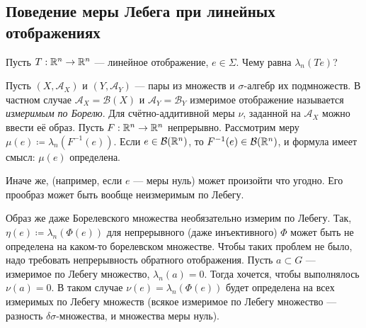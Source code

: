 \documentclass[a4paper]{report}
\begin{document}
    \subsection{Поведение меры Лебега при линейных отображениях}
    Пусть $T: \mathbb{R}^n \rightarrow \mathbb{R}^n$ --- линейное отображение, $e \in \Sigma$.
    Чему равна $\lambda_n(Te)$?

    Пусть $(X, \mathcal{A}_X)$ и $(Y, \mathcal{A}_Y)$ --- пары из множеств и $\sigma$-алгебр их подмножеств.
    В частном случае $\mathcal{A}_X = \mathcal{B}(X)$ и $\mathcal{A}_Y = \mathcal{B}_Y$ измеримое отображение называется \emph{измеримым по Борелю}.
    Для счётно-аддитивной меры $\nu$, заданной на $\mathcal{A}_X$ можно ввести её образ.
    Пусть $F: \mathbb{R}^n \rightarrow \mathbb{R}^n$ непрерывно.
    Рассмотрим меру $\mu(e) \coloneqq \lambda_n(F^{-1}(e))$.
    Если $e \in \mathcal{B}(\mathbb{R}^n)$, то $F^{-1}(e) \in \mathcal{B}(\mathbb{R}^n)$, и формула имеет смысл: $\mu(e)$ определена.

    Иначе же, (например, если $e$ --- меры нуль) может произойти что угодно.
    Его прообраз может быть вообще неизмеримым по Лебегу.

    Образ же даже Борелевского множества необязательно измерим по Лебегу.
    Так, $\eta(e) \coloneqq \lambda_n(\Phi(e))$ для непрерывного (даже инъективного) $\Phi$ может быть не определена на каком-то борелевском множестве.
    Чтобы таких проблем не было, надо требовать непрерывность обратного отображения.
    Пусть $a \subset G$ --- измеримое по Лебегу множество, $\lambda_n(a) = 0$.
    Тогда хочется, чтобы выполнялось $\nu(a) = 0$.
    В таком случае $\nu(e) = \lambda_n(\Phi(e))$ будет определена на всех измеримых по Лебегу множеств (всякое измеримое по Лебегу множество --- разность $\delta\sigma$-множества, и множества меры нуль).
\end{document}
